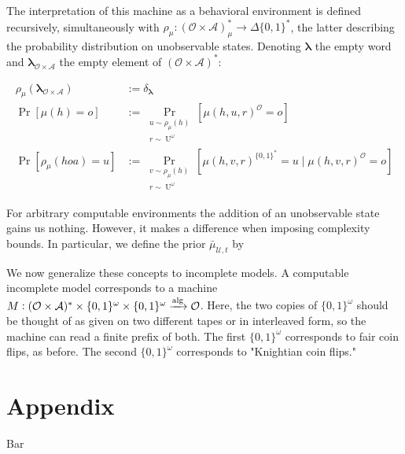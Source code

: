 \documentclass[a4paper]{article}
\newcommand{\Bool}{\{0,1\}}
\newcommand{\Words}{{\Bool^*}}
\newcommand{\Sagas}{{\Bool^\omega}}
\newcommand{\Estr}{{\bm{\lambda}}}
\DeclareMathOperator{\Prb}{Pr}
\newcommand{\PP}[2]{\operatorname{Pr}_{\substack{#1 \\ #2}}}
\DeclareMathOperator{\Un}{U}
\newcommand{\Abs}[1]{\lvert #1 \rvert}
\newcommand{\Alg}{\xrightarrow{\textnormal{alg}}}
\newcommand{\UTM}{\mathcal{U}}
\newcommand{\SP}[1]{\Delta #1}
\newcommand{\Act}{\mathcal{A}}
\newcommand{\Per}{\mathcal{O}}
\newcommand{\His}{(\Per \times \Act)^*}
\begin{document}
The interpretation of this machine as a behavioral environment is defined recursively, simultaneously with ${\rho_\mu: \His_\mu \rightarrow \SP{\Words}}$, the latter describing the probability distribution on unobservable states. Denoting ${\Estr}$ the empty word and ${\Estr_{\Per \times \Act}}$ the empty element of ${\His}$:

\begin{align*}
\rho_\mu(\Estr_{\Per \times \Act}) &:= \delta_\Estr \\
\Prb[\mu(h)=o] &:= \PP{u \sim \rho_\mu(h)}{r \sim \Un^\omega}[\mu(h,u,r)^\Per=o] \\
\Prb[\rho_\mu(hoa)=u] &:= \PP{v \sim \rho_\mu(h)}{r \sim \Un^\omega}[\mu(h,v,r)^\Words=u \mid \mu(h,v,r)^\Per=o]
\end{align*}

For arbitrary computable environments the addition of an unobservable state gains us nothing. However, it makes a difference when imposing complexity bounds. In particular, we define the prior ${\bar{\mu}_{\UTM,t}}$ by



We now generalize these concepts to incomplete models. A computable incomplete model corresponds to a machine ${M: \His \times \Sagas \times \Sagas \Alg \Per}$. Here, the two copies of ${\Sagas}$ should be thought of as given on two different tapes or in interleaved form, so the machine can read a finite prefix of both. The first ${\Sagas}$ corresponds to fair coin flips, as before. The second ${\Sagas}$ corresponds to "Knightian coin flips."

\section{Appendix}

Bar
\end{document}
